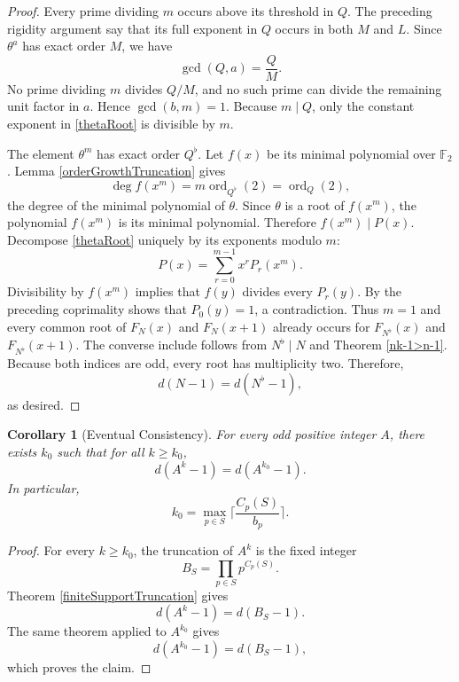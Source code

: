 \documentclass[a4paper]{article}
\newtheorem{corollary}[theorem]{Corollary}
\newcommand{\F}{\mathbb{F}}
\newcommand{\ord}[2][]{\operatorname{ord}_{#1}\!\left( #2 \right)}
\begin{document}
\begin{proof}
		Every prime dividing $m$ occurs above its threshold in $Q$.
		The preceding rigidity argument say that its full exponent in $Q$ occurs in both $M$ and $L$.
		Since $\theta^a$ has exact order $M$, we have
		\begin{equation*}
			\gcd{(Q,a)} = \frac{Q}{M}.
		\end{equation*}
		No prime dividing $m$ divides $Q/M$, and no such prime can divide the remaining unit factor in $a$.
		Hence $\gcd{(b,m)} = 1$.
		Because $m \mid Q$, only the constant exponent in \eqref{thetaRoot} is divisible by $m$.
	
		The element $\theta^m$ has exact order $Q^\flat$.
		Let $f(x)$ be its minimal polynomial over $\F_2$.
		Lemma \ref{orderGrowthTruncation} gives
		\begin{equation*}
			\deg{f(x^m)} = m \ord[Q^\flat]{2} = \ord[Q]{2},
		\end{equation*}
		the degree of the minimal polynomial of $\theta$.
		Since $\theta$ is a root of $f(x^m)$, the polynomial $f(x^m)$ is its minimal polynomial.
		Therefore $f(x^m) \mid P(x)$.
		Decompose \eqref{thetaRoot} uniquely by its exponents modulo $m$:
		\begin{equation*}
			P(x) = \sum_{r=0}^{m-1}{x^r P_r(x^m)}.
		\end{equation*}
		Divisibility by $f(x^m)$ implies that $f(y)$ divides every $P_r(y)$.
		By the preceding coprimality shows that $P_0(y)=1$, a contradiction.
		Thus $m=1$ and every common root of $F_N(x)$ and $F_N(x+1)$ already occurs for $F_{N^\flat}(x)$ and $F_{N^\flat}(x+1)$.
		The converse include follows from $N^\flat \mid N$ and Theorem \ref{nk-1>n-1}.
		Because both indices are odd, every root has multiplicity two.
		Therefore,
		\begin{equation*}
			d(N-1) = d(N^\flat - 1),
		\end{equation*}
		as desired.
	\end{proof}

	\begin{corollary}[Eventual Consistency]
		For every odd positive integer $A$, there exists $k_0$ such that for all $k \geq k_0$,
		\begin{equation*}
			d(A^k - 1) = d(A^{k_0} - 1).
		\end{equation*}
		In particular,
		\begin{equation*}
			k_0 = \max_{p \in S}{\lceil\frac{C_p(S)}{b_p}\rceil}.
		\end{equation*}
	\end{corollary}
	\begin{proof}
		For every $k \geq k_0$, the truncation of $A^k$ is the fixed integer
		\begin{equation*}
			B_S = \prod_{p \in S}{p^{C_p(S)}}.
		\end{equation*}
		Theorem \ref{finiteSupportTruncation} gives
		\begin{equation*}
			d(A^k - 1) = d(B_S - 1).
		\end{equation*}
		The same theorem applied to $A^{k_0}$ gives
		\begin{equation*}
			d(A^{k_0} - 1) = d(B_S - 1),
		\end{equation*}
		which proves the claim.
	\end{proof}
\end{document}
